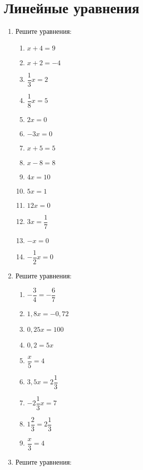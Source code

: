 \documentclass[12pt, a4paper]{article}
\begin{document}
		

\section{Линейные уравнения}

\begin{enumerate}
	\item Решите уравнения:
	\begin{multicols}{4}
		\begin{enumerate}[label=\asbuk*)]
			\item $x+4=9$
			\item $x+2=-4$
			\item $\dfrac{1}{3}x=2$
			\item $\dfrac{1}{8}x=5$
			\item $2x=0$
			\item $-3x=0$
			\item $x+5=5$
			\item $x-8=8$
			\item $4x=10$
			\item $5x=1$
			\item $12x=0$
			\item $3x=\dfrac{1}{7}$
			\item $-x=0$
			\item $-\dfrac{1}{2}x=0$
		\end{enumerate}
	\end{multicols}
	\item Решите уравнения:
	\begin{multicols}{3}
		\begin{enumerate}[label=\asbuk*)]
			\item $-\dfrac{3}{4}=-\dfrac{6}{7}$
			\item $1,8x=-0,72$
			\item $0,25x=100$
			\item $0,2=5x$
			\item $\dfrac{x}{5}=4$
			\item $3,5x=2\dfrac{1}{3}$
			\item $-2\dfrac{1}{3}x=7$
			\item $1\dfrac{2}{3}=2\dfrac{1}{3}$
			\item $\dfrac{x}{3}=4$
		\end{enumerate}
	\end{multicols}
	\item Решите уравнения:
	\begin{multicols}{3}
		\begin{enumerate}[label=\asbuk*)]

\end{enumerate}
\end{multicols}
\end{enumerate}
\end{document}
